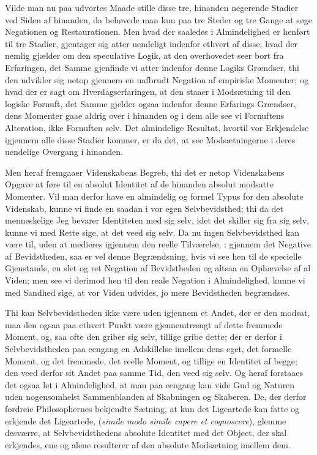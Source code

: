 \documentclass[12pt]{book}
\newcommand{\dsi}{\reflectbox{c}:}
\newcommand{\opage}[1]{\marginnote{\footnotesize\textit{[#1]}}}
\begin{document}
Vilde man nu paa udvortes Maade stille disse tre, hinanden negerende
Stadier ved Siden af hinanden, da behøvede man kun paa tre Steder og
tre Gange at søge Negationen og Restaurationen. Men hvad der saaledes
i Almindelighed er henført til tre Stadier, gjentager sig atter
uendeligt indenfor ethvert af disse; hvad der nemlig gjælder om den
speculative Logik, at den overhovedet seer bort fra Erfaringen, det
Samme gjenfinde vi atter indenfor denne Logiks Grændser, thi den
udvikler sig netop gjennem en uafbrudt Negation af empiriske
Momenter; og hvad der er sagt om Hverdagserfaringen, at den staaer i
Modsætning til den logiske Fornuft, det Samme gjelder ogsaa indenfor
denne Erfarings Grændser, dens Momenter gaae aldrig over i hinanden og
i dem alle see vi Fornuftens Alteration, ikke Fornuften selv. Det
almindelige Resultat, hvortil vor Erkjendelse igjennem alle disse
Stadier kommer, er da det, at see Modsætningerne i deres uendelige
Overgang i hinanden.

Men heraf fremgaaer Videnskabens Begreb, thi det er netop
Videnskabens Opgave at føre til en absolut Identitet af de hinanden
absolut modsatte Momenter. Vil man derfor have en almindelig og formel
Typus for den absolute Videnskab, kunne vi finde en saadan i vor egen
Selvbevidsthed; thi da det menneskelige Jeg bevarer Identiteten med
sig selv, idet det skiller sig fra sig selv, kunne vi med Rette sige,
at det veed sig selv. Da nu ingen Selvbevidsthed kan være til, uden at
medieres igjennem den reelle Tilværelse, \dsi{} gjennem det Negative af
Bevidstheden, saa er vel denne Begrændsning, hvis vi
\opage{32} see hen til de specielle Gjenstande, en slet og ret Negation af
Bevidstheden og altsaa en Ophævelse af al Viden; men see vi derimod
hen til den reale Negation i Almindelighed, kunne vi med Sandhed sige,
at vor Viden udvides, jo mere Bevidstheden begrændses.

Thi kan Selvbevidstheden ikke være uden igjennem et Andet, der er den
modsat, maa den ogsaa paa ethvert Punkt være gjennemtrængt af dette
fremmede Moment, og, saa ofte den griber sig selv, tillige gribe
dette; der er derfor i Selvbevidstheden paa eengang en Adskillelse
imellem dens eget, det formelle Moment, og det fremmede, det reelle
Moment, og tillige en Identitet af begge; den veed derfor sit Andet
paa samme Tid, den veed sig selv. Og heraf forstaaes det ogsaa let i
Almindelighed, at man paa eengang kan vide Gud og Naturen uden
nogensomhelst Sammenblanden af Skabningen og Skaberen. De, der derfor
fordreie Philosophernes bekjendte Sætning, at kun det Ligeartede kan
fatte og erkjende det Ligeartede, (\textit{simile modo simile capere
et cognoscere}), glemme desværre, at Selvbevidsthedens absolute
Identitet med det Object, der skal erkjendes, ene og alene resulterer
af den absolute Modsætning imellem dem.
\end{document}

